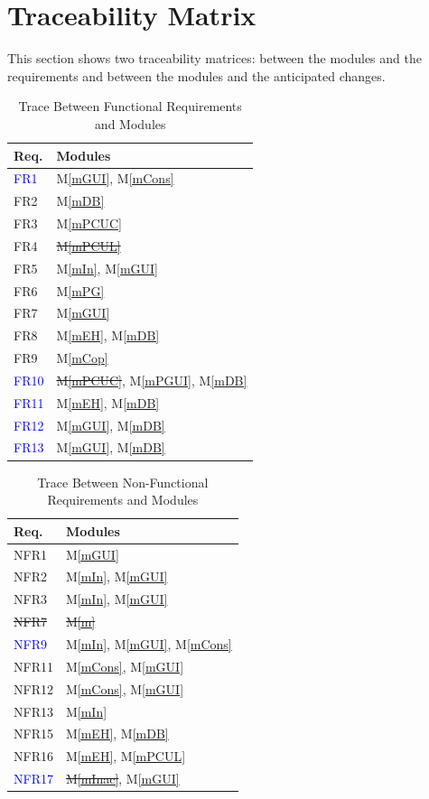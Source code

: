 \documentclass[12pt, titlepage]{article}
\newcommand{\mref}[1]{M\ref{#1}}
\begin{document}
\section{Traceability Matrix} \label{SecTM}

This section shows two traceability matrices: between the modules and the
requirements and between the modules and the anticipated changes.

\begin{table}[H]
\centering
\begin{tabular}{p{} p{}}
\toprule
\textbf{Req.} & \textbf{Modules}\\
\midrule
\textcolor{blue}{FR1} & \mref{mGUI}, \mref{mCons}\\
FR2 & \mref{mDB}\\
FR3 & \mref{mPCUC}\\
FR4 & \sout{\mref{mPCUL}}\\
FR5 & \mref{mIn}, \mref{mGUI}\\
FR6 & \mref{mPG}\\
FR7 & \mref{mGUI}\\
FR8 & \mref{mEH}, \mref{mDB}\\
FR9 & \mref{mCop}\\
\textcolor{blue}{FR10} & \sout{\mref{mPCUC}}, \mref{mPGUI}, \mref{mDB}\\
\textcolor{blue}{FR11} & \mref{mEH}, \mref{mDB}\\
\textcolor{blue}{FR12} & \mref{mGUI}, \mref{mDB}\\
\textcolor{blue}{FR13} & \mref{mGUI}, \mref{mDB}\\
\bottomrule
\end{tabular}
\caption{Trace Between Functional Requirements and Modules}
\label{TblRT}
\end{table}

\begin{table}[H]
\centering
\begin{tabular}{p{} p{}}
\toprule
\textbf{Req.} & \textbf{Modules}\\
\midrule
NFR1 & \mref{mGUI}\\
NFR2 & \mref{mIn}, \mref{mGUI}\\
NFR3 & \mref{mIn}, \mref{mGUI}\\
\sout{NFR7} & \sout{\mref{m}}\\
\textcolor{blue}{NFR9} & \mref{mIn}, \mref{mGUI}, \mref{mCons}\\
NFR11 & \mref{mCons}, \mref{mGUI}\\
NFR12 & \mref{mCons}, \mref{mGUI}\\
NFR13 & \mref{mIn}\\
NFR15 & \mref{mEH}, \mref{mDB}\\
NFR16 & \mref{mEH}, \mref{mPCUL}\\
\textcolor{blue}{NFR17} & \sout{\mref{mInac}}, \mref{mGUI}\\
\bottomrule
\end{tabular}
\caption{Trace Between Non-Functional Requirements and Modules}
\label{TblRT}
\end{table}
\end{document}
